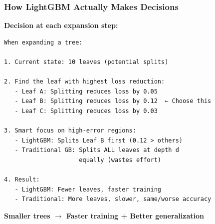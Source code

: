\documentclass{beamer}
\begin{document}
\begin{frame}[fragile]
\frametitle{How LightGBM Actually Makes Decisions}

\textbf{Decision at each expansion step:}

{\small
\begin{lstlisting}
When expanding a tree:

1. Current state: 10 leaves (potential splits)

2. Find the leaf with highest loss reduction:
   - Leaf A: Splitting reduces loss by 0.05
   - Leaf B: Splitting reduces loss by 0.12  ← Choose this
   - Leaf C: Splitting reduces loss by 0.03

3. Smart focus on high-error regions:
   - LightGBM: Splits Leaf B first (0.12 > others)
   - Traditional GB: Splits ALL leaves at depth d
                     equally (wastes effort)

4. Result:
   - LightGBM: Fewer leaves, faster training
   - Traditional: More leaves, slower, same/worse accuracy
\end{lstlisting}
}

\vspace{0.2cm}
\textbf{Smaller trees $\rightarrow$ Faster training + Better generalization}

\end{frame}
\end{document}
